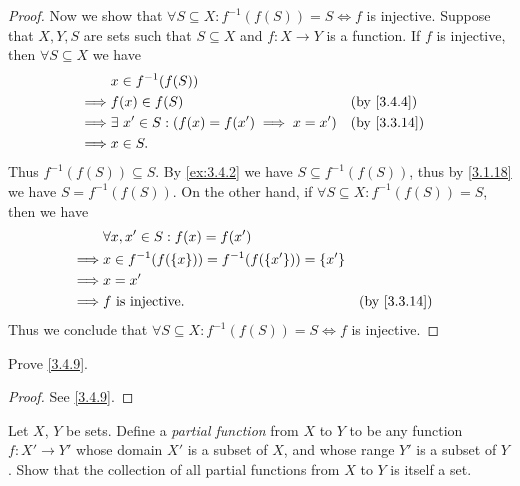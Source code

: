 \begin{proof}
  Now we show that \(\forall S \subseteq X : f^{-1}(f(S)) = S \iff f\) is injective.
  Suppose that \(X, Y, S\) are sets such that \(S \subseteq X\) and \(f : X \to Y\) is a function.
  If \(f\) is injective, then \(\forall S \subseteq X\) we have
  \begin{align*}
             & x \in f^{-1}(f(S))                                                                \\
    \implies & f(x) \in f(S)                                      &  & \by{3.4.4}                \\
    \implies & \exists\ x' \in S : (f(x) = f(x') \implies x = x') &  & \text{(by \cref{3.3.14})} \\
    \implies & x \in S.
  \end{align*}
  Thus \(f^{-1}(f(S)) \subseteq S\).
  By \cref{ex:3.4.2} we have \(S \subseteq f^{-1}(f(S))\), thus by \cref{3.1.18} we have \(S = f^{-1}(f(S))\).
  On the other hand, if \(\forall S \subseteq X : f^{-1}(f(S)) = S\), then we have
  \begin{align*}
             & \forall x, x' \in S : f(x) = f(x')                                                 \\
    \implies & x \in f^{-1}(f(\{x\})) = f^{-1}(f(\{x'\})) = \{x'\}                                \\
    \implies & x = x'                                                                             \\
    \implies & f \text{ is injective}.                             &  & \text{(by \cref{3.3.14})}
  \end{align*}
  Thus we conclude that \(\forall S \subseteq X : f^{-1}(f(S)) = S \iff f\) is injective.
\end{proof}

\begin{ex}\label{ex:3.4.6}
  Prove \cref{3.4.9}.
\end{ex}

\begin{proof}
  See \cref{3.4.9}.
\end{proof}

\begin{ex}\label{ex:3.4.7}
  Let \(X\), \(Y\) be sets.
  Define a \emph{partial function} from \(X\) to \(Y\) to be any function \(f : X' \to Y'\) whose domain \(X'\) is a subset of \(X\), and whose range \(Y'\) is a subset of \(Y\).
  Show that the collection of all partial functions from \(X\) to \(Y\) is itself a set.
\end{ex}

